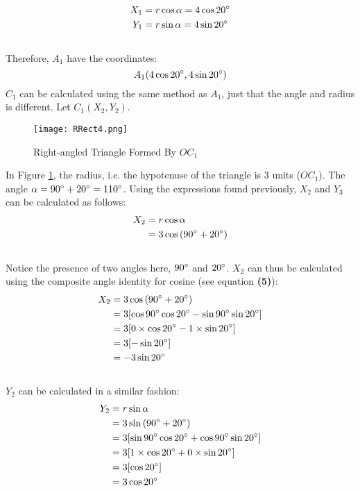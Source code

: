 \documentclass{article}
\begin{document}
        \begin{align*}
            X_1 &= r\cos{\alpha} = 4\cos{20\degree} \\
            Y_1 &= r\sin{\alpha} = 4\sin{20\degree}
        \end{align*} \\
        Therefore, $A_1$ have the coordinates:
        \begin{equation}
            A_1(4\cos{20\degree}, 4\sin{20\degree})
        \end{equation}
        $C_1$ can be calculated using the same method as $A_1$, just that the angle and radius is different. Let $C_1(X_2, Y_2)$.
        \begin{figure}[h!]
            \texttt{[image: RRect4.png]}
            \caption{Right-angled Triangle Formed By $OC_1$}
            \label{fig:rrect4}
        \end{figure}  \newpage
        In Figure \ref{fig:rrect4}, the radius, i.e. the hypotenuse of the triangle is 3 units ($OC_1$). The angle $\alpha = 90\degree + 20\degree = 110\degree$. Using the expressions found previously, $X_2$ and $Y_3$ can be calculated as follows:
        \begin{align*}
            X_2 &= r\cos{\alpha} \\
            &= 3\cos{(90\degree + 20\degree)}
        \end{align*} \\
        Notice the presence of two angles here, $90\degree$ and $20\degree$. $X_2$ can thus be calculated using the composite angle identity for cosine (see equation \textbf{(5)}):
        \begin{align*}
            X_2 &= 3\cos{(90\degree + 20\degree)} \\
            &= 3[\cos{90\degree}\cos{20\degree} - \sin{90\degree}\sin{20\degree}] \\
            &= 3[0\times\cos{20\degree} - 1\times\sin{20\degree}] \\
            &= 3[-\sin{20\degree}] \\
            &= -3\sin{20\degree}
        \end{align*}\\
        $Y_2$ can be calculated in a similar fashion:
        \begin{align*}
            Y_2 &= r\sin{\alpha} \\
            &= 3\sin{(90\degree + 20\degree)} \\
            &= 3[\sin{90\degree}\cos{20\degree} + \cos{90\degree}\sin{20\degree}] \\
            &= 3[1\times\cos{20\degree} + 0\times\sin{20\degree}] \\
            &= 3[\cos{20\degree}] \\
            &= 3\cos{20\degree}
        \end{align*} \\
\end{document}

